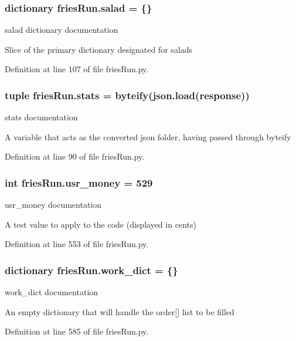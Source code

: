 \hypertarget{namespacefriesRun_a8c56415017b0ea056f28644f4f6180f8}{
\subsubsection[{salad}]{\setlength{\rightskip}{0pt plus 5cm}dictionary fries\-Run.\-salad = \{\}}}\label{namespacefriesRun_a8c56415017b0ea056f28644f4f6180f8}


salad dictionary documentation 

Slice of the primary dictionary designated for salads 

Definition at line 107 of file fries\-Run.\-py.

\hypertarget{namespacefriesRun_addc61f011fd734bf5a633745fea31de4}{
\subsubsection[{stats}]{\setlength{\rightskip}{0pt plus 5cm}tuple fries\-Run.\-stats = {\bf byteify}(json.\-load({\bf response}))}}\label{namespacefriesRun_addc61f011fd734bf5a633745fea31de4}


stats documentation 

A variable that acts as the converted json folder, having passed through byteify 

Definition at line 90 of file fries\-Run.\-py.

\hypertarget{namespacefriesRun_a6afc58a323f2b960b383b9cfeedf5406}{
\subsubsection[{usr\-\_\-money}]{\setlength{\rightskip}{0pt plus 5cm}int fries\-Run.\-usr\-\_\-money = 529}}\label{namespacefriesRun_a6afc58a323f2b960b383b9cfeedf5406}


usr\-\_\-money documentation 

A test value to apply to the code (displayed in cents) 

Definition at line 553 of file fries\-Run.\-py.

\hypertarget{namespacefriesRun_a458cd2429c5160676a31562c46a92be1}{
\subsubsection[{work\-\_\-dict}]{\setlength{\rightskip}{0pt plus 5cm}dictionary fries\-Run.\-work\-\_\-dict = \{\}}}\label{namespacefriesRun_a458cd2429c5160676a31562c46a92be1}


work\-\_\-dict documentation 

An empty dictionary that will handle the order\mbox{[}\mbox{]} list to be filled 

Definition at line 585 of file fries\-Run.\-py.

